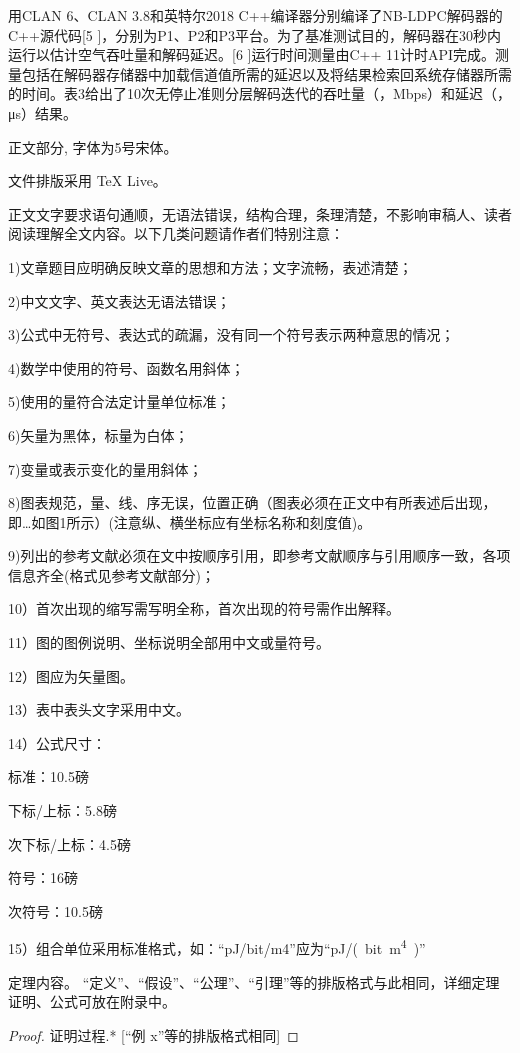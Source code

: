 \documentclass{cjc}
\begin{document}
  用CLAN 6、CLAN 3.8和英特尔2018 C++编译器分别编译了NB-LDPC解码器的C++源代码[5 ]，分别为P1、P2和P3平台。为了基准测试目的，解码器在30秒内运行以估计空气吞吐量和解码延迟。[6 ]运行时间测量由C++ 11计时API完成。测量包括在解码器存储器中加载信道值所需的延迟以及将结果检索回系统存储器所需的时间。表3给出了10次无停止准则分层解码迭代的吞吐量（，Mbps）和延迟（，μs）结果。

正文部分, 字体为5号宋体。

文件排版采用 TeX Live。

正文文字要求语句通顺，无语法错误，结构合理，条理清楚，不影响审稿人、读者阅读理解全文内容。以下几类问题请作者们特别注意：

1)文章题目应明确反映文章的思想和方法；文字流畅，表述清楚；

2)中文文字、英文表达无语法错误；

3)公式中无符号、表达式的疏漏，没有同一个符号表示两种意思的情况；

4)数学中使用的符号、函数名用斜体；

5)使用的量符合法定计量单位标准；

6)矢量为黑体，标量为白体；

7)变量或表示变化的量用斜体；

8)图表规范，量、线、序无误，位置正确（图表必须在正文中有所表述后出现，即…如图1所示）(注意纵、横坐标应有坐标名称和刻度值)。

9)列出的参考文献必须在文中按顺序引用，即参考文献顺序与引用顺序一致，各项信息齐全(格式见参考文献部分)；

10）首次出现的缩写需写明全称，首次出现的符号需作出解释。

11）图的图例说明、坐标说明全部用中文或量符号。

12）图应为矢量图。

13）表中表头文字采用中文。

14）公式尺寸：

标准：10.5磅

下标/上标：5.8磅

次下标/上标：4.5磅

符号：16磅

次符号：10.5磅

15）组合单位采用标准格式，如：“pJ/bit/m4”应为“\si{pJ/(bit.m^4)}”


\begin{theorem}
  定理内容。
  “定义”、“假设”、“公理”、“引理”等的排版格式与此相同，详细定理证明、公式可放在附录中。
\end{theorem}

\begin{proof}
  证明过程.* [“例 x”等的排版格式相同]
\end{proof}
\end{document}
